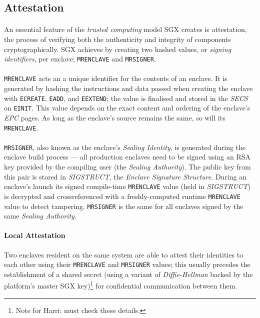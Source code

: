 \subsection{Attestation}
\label{sec:attestation}

\paragraph{} An essential feature of the \textit{trusted computing} model SGX creates is attestation, the process of verifying both the authenticity and integrity of components cryptographically. SGX achieves by creating two hashed values, or \textit{signing identifiers}, per enclave; \texttt{MRENCLAVE} and \texttt{MRSIGNER}.~\cite{Anati2013InnovativeTF,sgx-prov-service}

\paragraph{} \texttt{MRENCLAVE} acts an a unique identifier for the contents of an enclave. It is generated by hashing the instructions and data passed when creating the enclave with \texttt{ECREATE}, \texttt{EADD}, and \texttt{EEXTEND}; the value is finalised and stored in the \textit{SECS} on \texttt{EINIT}. This value depends on the exact content and ordering of the enclave's \textit{EPC} pages. As long as the enclave's source remains the same, so will its \texttt{MRENCLAVE}.

\paragraph{} \texttt{MRSIGNER}, also known as the enclave's \textit{Sealing Identity}, is generated during the enclave build process --- all production enclaves need to be signed using an RSA key provided by the compiling user (the \textit{Sealing Authority}). The public key from this pair is stored in \textit{SIGSTRUCT}, the \textit{Enclave Signature Structure}. During an enclave's launch its signed compile-time \texttt{MRENCLAVE} value (held in \textit{SIGSTRUCT}) is decrypted and crossreferenced with a freshly-computed runtime \texttt{MRENCLAVE} value to detect tampering. \texttt{MRSIGNER} is the same for all enclaves signed by the same \textit{Sealing Authority}.

\paragraph{Local Attestation} Two enclaves resident on the same system are able to attest their identities to each other using their \texttt{MRENCLAVE} and \texttt{MRSIGNER} values; this usually precedes the establishment of a shared secret (using a variant of \textit{Diffie-Hellman} backed by the platform's master SGX key)\footnote{Note for Harri: must check these details.} for confidential communication between them.

